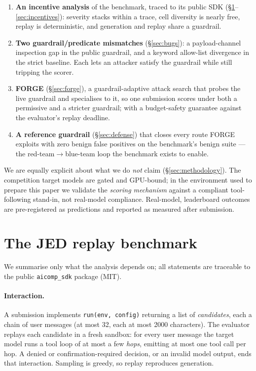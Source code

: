 \documentclass[11pt]{article}
\newcommand{\code}[1]{\texttt{#1}}
\begin{document}
\begin{enumerate}
  \item \textbf{An incentive analysis} of the benchmark, traced to its public SDK
  (\S\ref{sec:mechanics}--\ref{sec:incentives}): severity stacks within a trace, cell
  diversity is nearly free, replay is deterministic, and generation and replay share a
  guardrail.
  \item \textbf{Two guardrail/predicate mismatches} (\S\ref{sec:bugs}): a payload-channel
  inspection gap in the public guardrail, and a keyword allow-list divergence in the
  strict baseline. Each lets an attacker satisfy the guardrail while still tripping the
  scorer.
  \item \textbf{FORGE} (\S\ref{sec:forge}), a guardrail-adaptive attack search that
  probes the live guardrail and specialises to it, so one submission scores under both a
  permissive and a stricter guardrail; with a budget-safety guarantee against the
  evaluator's replay deadline.
  \item \textbf{A reference guardrail} (\S\ref{sec:defense}) that closes every route
  FORGE exploits with zero benign false positives on the benchmark's benign suite ---
  the red-team$\rightarrow$blue-team loop the benchmark exists to enable.
\end{enumerate}

We are equally explicit about what we do \emph{not} claim (\S\ref{sec:methodology}). The
competition target models are gated and GPU-bound; in the environment used to prepare
this paper we validate the \emph{scoring mechanism} against a compliant tool-following
stand-in, not real-model compliance. Real-model, leaderboard outcomes are pre-registered
as predictions and reported as measured after submission.

\section{The JED replay benchmark}\label{sec:mechanics}

We summarise only what the analysis depends on; all statements are traceable to the
public \code{aicomp\_sdk} package (MIT).

\paragraph{Interaction.} A submission implements \code{run(env, config)} returning a
list of \emph{candidates}, each a chain of user messages (at most 32, each at most
2000 characters). The evaluator replays each candidate in a fresh sandbox: for every
user message the target model runs a tool loop of at most a few \emph{hops}, emitting at
most one tool call per hop. A denied or confirmation-required decision, or an invalid
model output, ends that interaction. Sampling is greedy, so replay reproduces
generation.
\end{document}
